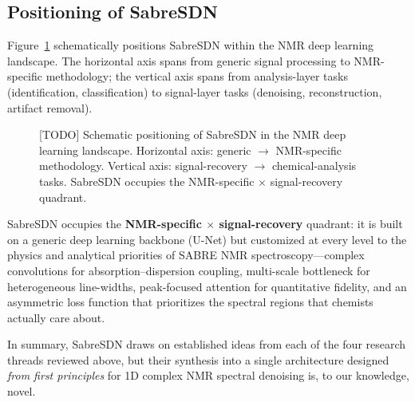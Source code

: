 \subsection{Positioning of SabreSDN}
\label{sec:rw_positioning}

Figure~\ref{fig:positioning} schematically positions SabreSDN within the
NMR deep learning landscape. The horizontal axis spans from generic signal
processing to NMR-specific methodology; the vertical axis spans from
analysis-layer tasks (identification, classification) to signal-layer tasks
(denoising, reconstruction, artifact removal).

\begin{figure}[t]
    \centering
    \caption{[TODO] Schematic positioning of SabreSDN in the NMR deep learning
             landscape. Horizontal axis: generic $\to$ NMR-specific methodology.
             Vertical axis: signal-recovery $\to$ chemical-analysis tasks.
             SabreSDN occupies the NMR-specific $\times$ signal-recovery
             quadrant.}
    \label{fig:positioning}
\end{figure}

SabreSDN occupies the \textbf{NMR-specific $\times$ signal-recovery} quadrant:
it is built on a generic deep learning backbone (U-Net) but customized at
every level to the physics and analytical priorities of SABRE NMR
spectroscopy---complex convolutions for absorption--dispersion coupling,
multi-scale bottleneck for heterogeneous line-widths, peak-focused attention
for quantitative fidelity, and an asymmetric loss function that prioritizes
the spectral regions that chemists actually care about.

In summary, SabreSDN draws on established ideas from each of the four
research threads reviewed above, but their synthesis into a single
architecture designed \emph{from first principles} for 1D complex NMR
spectral denoising is, to our knowledge, novel.
